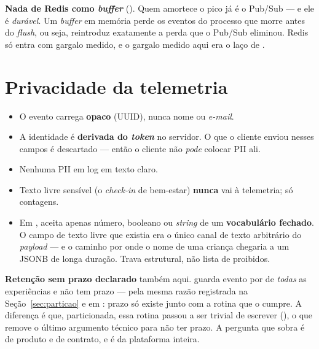 \begin{decisao}
\textbf{Nada de Redis como \emph{buffer}} (). Quem amortece o pico
já é o Pub/Sub --- e ele é \emph{durável}. Um \emph{buffer} em memória perde os
eventos do processo que morre antes do \emph{flush}, ou seja, reintroduz
exatamente a perda que o Pub/Sub eliminou. Redis só entra com gargalo medido, e o
gargalo medido aqui era o laço de .
\end{decisao}

\section{Privacidade da telemetria}

\begin{regra}
\begin{itemize}
  \item O evento carrega  \textbf{opaco} (UUID), nunca nome ou
    \emph{e-mail}.
  \item A identidade é \textbf{derivada do \emph{token}} no servidor. O que o
    cliente enviou nesses campos é descartado --- então o cliente não
    \emph{pode} colocar PII ali.
  \item Nenhuma PII em log em texto claro.
  \item Texto livre sensível (o \emph{check-in} de bem-estar) \textbf{nunca} vai
    à telemetria; só contagens.
  \item Em ,  aceita apenas
    número, booleano ou \emph{string} de um \textbf{vocabulário fechado}. O campo
    de texto livre que existia era o único canal de texto arbitrário do
    \emph{payload} --- e o caminho por onde o nome de uma criança chegaria a um
    JSONB de longa duração. Trava estrutural, não lista de proibidos.
\end{itemize}
\end{regra}

\begin{limitacao}
\textbf{Retenção sem prazo declarado} também aqui. 
guarda evento por  de \emph{todas} as experiências e não tem prazo
--- pela mesma razão registrada na Seção~\ref{sec:particao} e em :
prazo só existe junto com a rotina que o cumpre. A diferença é que, particionada,
essa rotina passou a ser trivial de escrever (), o que remove o último argumento técnico para não ter prazo.
A pergunta que sobra é de produto e de contrato, e é da plataforma inteira.
\end{limitacao}

